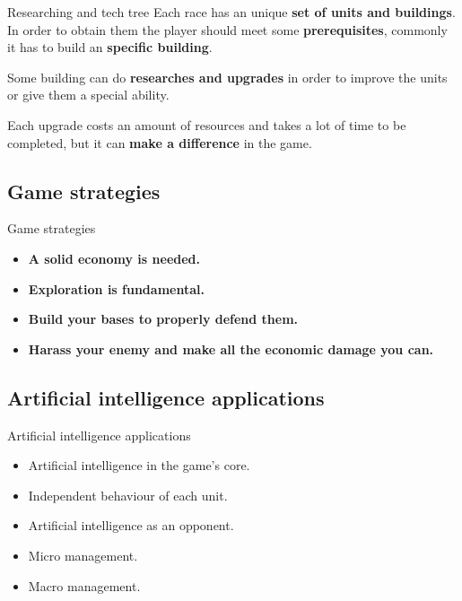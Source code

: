 \documentclass[10pt]{beamer}
\begin{document}
\begin{frame}{Researching and tech tree}
      Each race has an unique \textbf{set of units and buildings}. In order to obtain them the player should meet some \textbf{prerequisites}, commonly it has to build an \textbf{specific building}.\newline

      Some building can do \textbf{researches and upgrades} in order to improve the units or give them a special ability. \newline

Each upgrade costs an amount of resources and takes a lot of time to be completed, but it can \textbf{make a difference} in the game.
\end{frame}

\subsection{Game strategies}


\begin{frame}{Game strategies}
     \begin{itemize}
     \item \textbf{A solid economy is needed.}
     \item \textbf{Exploration is fundamental.}
     \item \textbf{Build your bases to properly defend them.}
     \item \textbf{Harass your enemy and make all the economic damage you can.}
    \end{itemize}
\end{frame}

\subsection{Artificial intelligence applications}

\begin{frame}{Artificial intelligence applications}

\begin{itemize}
 \item Artificial intelligence in the game's core.
 \item Independent behaviour of each unit.
 \item Artificial intelligence as an opponent.
 \item Micro management.
 \item Macro management.
\end{itemize}

\end{frame}
\end{document}
